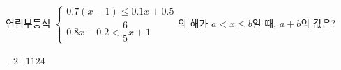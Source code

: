 연립부등식 $\begin{cases} 0.7(x-1)\le 0.1x+0.5 \\[0.6ex] 0.8x-0.2<\dfrac{6}{5}x+1 \end{cases}$의 해가 $a<x\le b$일 때, $a+b$의 값은?
\begin{choices32}{$-2$}{$-1$}{$1$}{$2$}{$4$}\end{choices32}
